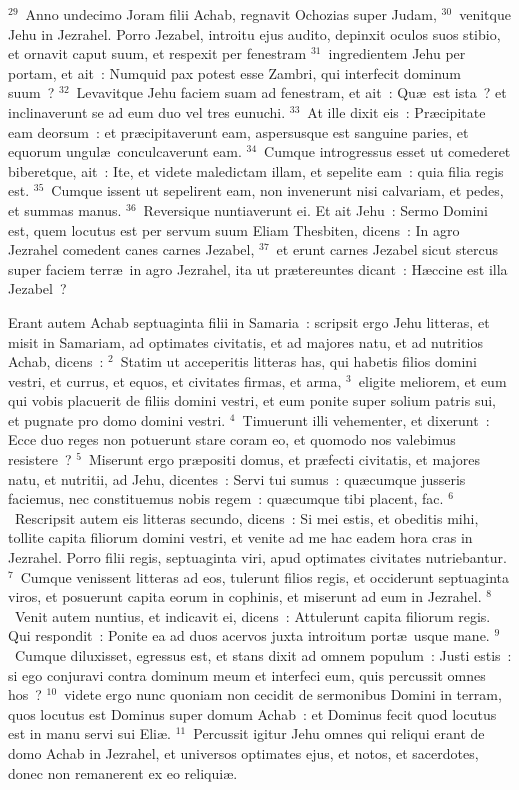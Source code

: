 ${}^{29}$~Anno undecimo Joram filii Achab, regnavit Ochozias super Judam,
${}^{30}$~venitque Jehu in Jezrahel. Porro Jezabel, introitu ejus audito, depinxit oculos suos stibio, et ornavit caput suum, et respexit per fenestram
${}^{31}$~ingredientem Jehu per portam, et ait~: Numquid pax potest esse Zambri, qui interfecit dominum suum~?
${}^{32}$~Levavitque Jehu faciem suam ad fenestram, et ait~: Qu\ae\ est ista~? et inclinaverunt se ad eum duo vel tres eunuchi.
${}^{33}$~At ille dixit eis~: Pr\ae cipitate eam deorsum~: et pr\ae cipitaverunt eam, aspersusque est sanguine paries, et equorum ungul\ae\ conculcaverunt eam.
${}^{34}$~Cumque introgressus esset ut comederet biberetque, ait~: Ite, et videte maledictam illam, et sepelite eam~: quia filia regis est.
${}^{35}$~Cumque issent ut sepelirent eam, non invenerunt nisi calvariam, et pedes, et summas manus.
${}^{36}$~Reversique nuntiaverunt ei. Et ait Jehu~: Sermo Domini est, quem locutus est per servum suum Eliam Thesbiten, dicens~: In agro Jezrahel comedent canes carnes Jezabel,
${}^{37}$~et erunt carnes Jezabel sicut stercus super faciem terr\ae\ in agro Jezrahel, ita ut pr\ae tereuntes dicant~: H\ae ccine est illa Jezabel~?

\lettrine[lines=10,image=true,loversize=0.05,lraise=-0.03]{E}{}rant autem Achab septuaginta filii in Samaria~: scripsit ergo Jehu litteras, et misit in Samariam, ad optimates civitatis, et ad majores natu, et ad nutritios Achab, dicens~:
${}^{2}$~Statim ut acceperitis litteras has, qui habetis filios domini vestri, et currus, et equos, et civitates firmas, et arma,
${}^{3}$~eligite meliorem, et eum qui vobis placuerit de filiis domini vestri, et eum ponite super solium patris sui, et pugnate pro domo domini vestri.
${}^{4}$~Timuerunt illi vehementer, et dixerunt~: Ecce duo reges non potuerunt stare coram eo, et quomodo nos valebimus resistere~?
${}^{5}$~Miserunt ergo pr\ae positi domus, et pr\ae fecti civitatis, et majores natu, et nutritii, ad Jehu, dicentes~: Servi tui sumus~: qu\ae cumque jusseris faciemus, nec constituemus nobis regem~: qu\ae cumque tibi placent, fac.
${}^{6}$~Rescripsit autem eis litteras secundo, dicens~: Si mei estis, et obeditis mihi, tollite capita filiorum domini vestri, et venite ad me hac eadem hora cras in Jezrahel. Porro filii regis, septuaginta viri, apud optimates civitates nutriebantur.
${}^{7}$~Cumque venissent litteras ad eos, tulerunt filios regis, et occiderunt septuaginta viros, et posuerunt capita eorum in cophinis, et miserunt ad eum in Jezrahel.
${}^{8}$~Venit autem nuntius, et indicavit ei, dicens~: Attulerunt capita filiorum regis. Qui respondit~: Ponite ea ad duos acervos juxta introitum port\ae\ usque mane.
${}^{9}$~Cumque diluxisset, egressus est, et stans dixit ad omnem populum~: Justi estis~: si ego conjuravi contra dominum meum et interfeci eum, quis percussit omnes hos~?
${}^{10}$~videte ergo nunc quoniam non cecidit de sermonibus Domini in terram, quos locutus est Dominus super domum Achab~: et Dominus fecit quod locutus est in manu servi sui Eli\ae .
${}^{11}$~Percussit igitur Jehu omnes qui reliqui erant de domo Achab in Jezrahel, et universos optimates ejus, et notos, et sacerdotes, donec non remanerent ex eo reliqui\ae .


